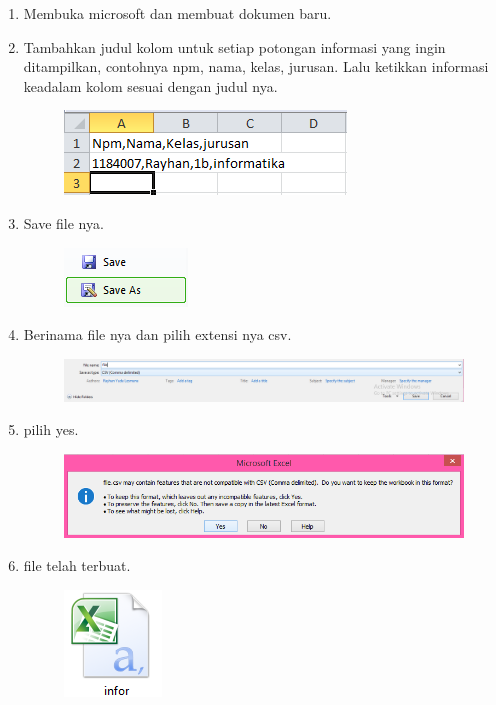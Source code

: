 \documentclass[a4paper,12pt]{report}
\begin{document}
\begin{enumerate}
\item Membuka microsoft dan membuat dokumen baru.
\newpage
\item Tambahkan judul kolom untuk setiap potongan informasi yang ingin ditampilkan,
contohnya npm, nama, kelas, jurusan. Lalu ketikkan informasi keadalam kolom sesuai dengan judul nya.\\

\begin{figure}[h]
\includegraphics[scale=0.8]{gambar/2.png}
\end{figure}

\item Save file nya.
\begin{figure}[h]
\includegraphics[scale=0.8]{gambar/3.png}
\end{figure}

\item Berinama file nya dan pilih extensi nya csv.
\begin{figure}[h]
\includegraphics[scale=0.3]{gambar/4.png}
\end{figure}
\newpage
\item pilih yes.
\begin{figure}[h]
\includegraphics[scale=0.3]{gambar/5.png}
\end{figure}

\item file telah terbuat.
\begin{figure}[h]
\includegraphics[scale=0.8]{gambar/6.png}
\end{figure}
\end{enumerate}
\end{document}
